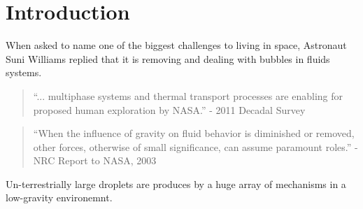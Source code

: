 \documentclass[10pt,a4paper]{article}
\author{Erin Schmidt}
\begin{document}
\doublespacing
\section{Introduction}
When asked to name one of the biggest challenges to living in
space, Astronaut Suni Williams replied that it is removing and
dealing with bubbles in fluids systems.

\begin{quote}
``... multiphase systems and thermal transport processes are enabling for proposed human exploration by NASA.''
- 2011 Decadal Survey
\end{quote}

\begin{quote}
``When the influence of gravity on fluid behavior is diminished or removed, other forces, otherwise of small significance, can assume paramount roles.''
- NRC Report to NASA, 2003
\end{quote}

Un-terrestrially large droplets are produces by a huge array of mechanisms in a low-gravity environemnt.
\end{document}
